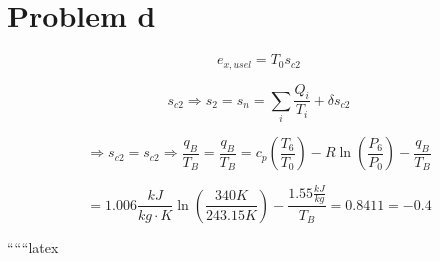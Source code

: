 \section*{Problem d}

\[
e_{x,usel} = T_0 s_{c2}
\]

\[
s_{c2} \Rightarrow s_2 = s_n = \sum_i \frac{Q_i}{T_i} + \delta s_{c2}
\]

\[
\Rightarrow s_{c2} = s_{c2} \Rightarrow \frac{q_B}{T_B} = \frac{q_B}{T_B} = c_p \left( \frac{T_6}{T_0} \right) - R \ln \left( \frac{P_6}{P_0} \right) - \frac{q_B}{T_B}
\]

\[
= 1.006 \frac{kJ}{kg \cdot K} \ln \left( \frac{340 K}{243.15 K} \right) - \frac{1.55 \frac{kJ}{kg}}{T_B} = 0.8411 = -0.4
\]

``````latex